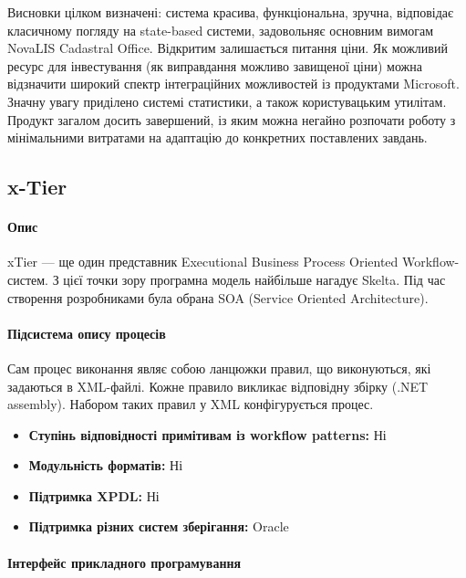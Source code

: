 \documentclass{memoir}
\begin{document}
Висновки цілком визначені: система красива, функціональна, зручна, відповідає класичному погляду на state-based системи, задовольняє основним вимогам NovaLIS Cadastral Office. Відкритим залишається питання ціни. Як можливий ресурс для інвестування (як виправдання можливо завищеної ціни) можна відзначити широкий спектр інтеграційних можливостей із продуктами Microsoft. Значну увагу приділено системі статистики, а також користувацьким утилітам. Продукт загалом досить завершений, із яким можна негайно розпочати роботу з мінімальними витратами на адаптацію до конкретних поставлених завдань.

\subsection{x-Tier}

\paragraph{Опис}

xTier — ще один представник Executional Business Process Oriented Workflow-систем. З цієї точки зору програмна модель найбільше нагадує Skelta. Під час створення розробниками була обрана SOA (Service Oriented Architecture).

\paragraph{Підсистема опису процесів}

Сам процес виконання являє собою ланцюжки правил, що виконуються, які задаються в XML-файлі. Кожне правило викликає відповідну збірку (.NET assembly). Набором таких правил у XML конфігурується процес.

\begin{itemize}
    \item \textbf{Ступінь відповідності примітивам із workflow patterns:} Ні
    \item \textbf{Модульність форматів:} Ні
    \item \textbf{Підтримка XPDL:} Ні
    \item \textbf{Підтримка різних систем зберігання:} Oracle
\end{itemize}

\paragraph{Інтерфейс прикладного програмування}
\end{document}
